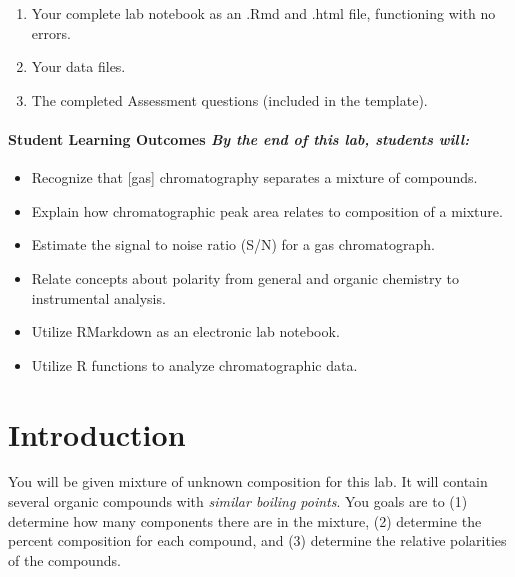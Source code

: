 \documentclass[]{tufte-book}
\providecommand{\tightlist}{%
  \setlength{\itemsep}{0pt}\setlength{\parskip}{0pt}}
\begin{document}
\begin{enumerate}
\def\labelenumi{\arabic{enumi}.}
\tightlist
\item
  Your complete lab notebook as an .Rmd and .html file, functioning with no errors.\\
\item
  Your data files.\\
\item
  The completed Assessment questions (included in the template).
\end{enumerate}

\hypertarget{student-learning-outcomes-by-the-end-of-this-lab-students-will}{%
\paragraph{\texorpdfstring{\textbf{Student Learning Outcomes} \textbar{} \emph{By the end of this lab, students will:}}{Student Learning Outcomes \textbar{} By the end of this lab, students will:}}\label{student-learning-outcomes-by-the-end-of-this-lab-students-will}}

\begin{itemize}
\tightlist
\item
  Recognize that {[}gas{]} chromatography separates a mixture of compounds.\\
\item
  Explain how chromatographic peak area relates to composition of a mixture.\\
\item
  Estimate the signal to noise ratio (S/N) for a gas chromatograph.
\item
  Relate concepts about polarity from general and organic chemistry to instrumental analysis.\\
\item
  Utilize RMarkdown as an electronic lab notebook.
\item
  Utilize R functions to analyze chromatographic data.
\end{itemize}

\hypertarget{introduction}{%
\section*{Introduction}\label{introduction}}

You will be given mixture of unknown composition for this lab. It will contain several organic compounds with \emph{similar boiling points}. You goals are to (1) determine how many components there are in the mixture, (2) determine the percent composition for each compound, and (3) determine the relative polarities of the compounds.
\end{document}
